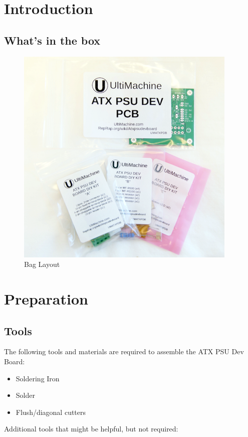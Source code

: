 \section{Introduction}

\subsection{What's in the box}

\begin{figure}[H]
\centering
\includegraphics{./png/kit.png}
\caption{Bag Layout}
\end{figure}

\section{Preparation}

\subsection{Tools}

The following tools and materials are required to assemble the ATX PSU
Dev Board:

\begin{itemize}
\itemsep1pt\parskip0pt
\item
  Soldering Iron
\item
  Solder
\item
  Flush/diagonal cutters
\end{itemize}

Additional tools that might be helpful, but not required:

